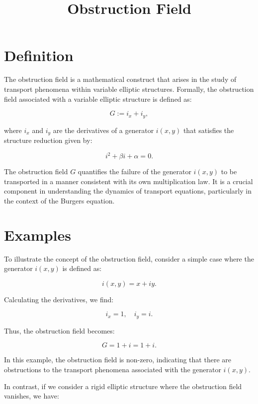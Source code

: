 \documentclass[11pt,a4paper]{article}
\title{Obstruction Field}
\date{}
\begin{document}
\maketitle
\section{Definition}
The obstruction field is a mathematical construct that arises in the study of transport phenomena within variable elliptic structures. Formally, the obstruction field associated with a variable elliptic structure is defined as:

\begin{equation}
G := i_x + i_y,
\end{equation}

where \(i_x\) and \(i_y\) are the derivatives of a generator \(i(x, y)\) that satisfies the structure reduction given by:

\begin{equation}
i^2 + \beta i + \alpha = 0.
\end{equation}

The obstruction field \(G\) quantifies the failure of the generator \(i(x, y)\) to be transported in a manner consistent with its own multiplication law. It is a crucial component in understanding the dynamics of transport equations, particularly in the context of the Burgers equation.

\section{Examples}
To illustrate the concept of the obstruction field, consider a simple case where the generator \(i(x, y)\) is defined as:

\begin{equation}
i(x, y) = x + iy.
\end{equation}

Calculating the derivatives, we find:

\[
i_x = 1, \quad i_y = i.
\]

Thus, the obstruction field becomes:

\[
G = 1 + i = 1 + i.
\]

In this example, the obstruction field is non-zero, indicating that there are obstructions to the transport phenomena associated with the generator \(i(x, y)\).

In contrast, if we consider a rigid elliptic structure where the obstruction field vanishes, we have:
\end{document}
